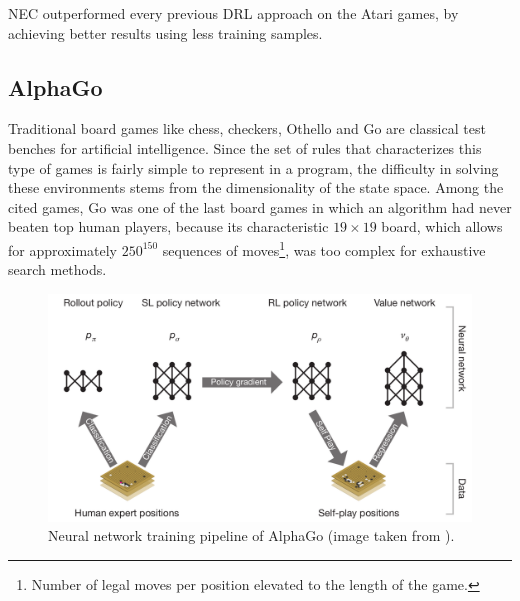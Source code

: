 NEC outperformed every previous DRL approach on the Atari games, by achieving 
better results using less training samples.

\subsection{AlphaGo} \label{s:alphago}
Traditional board games like chess, checkers, Othello and Go are classical 
test benches for artificial intelligence. Since the set of rules that
characterizes this type of games is fairly simple to represent in a program, the
difficulty in solving these environments stems from the dimensionality of the 
state space. Among the cited games, Go was one of the last board games in which 
an algorithm had never beaten top human players, because its characteristic 
$19 \times 19$ board, which allows for approximately $250^{150}$ sequences of
moves\footnote{Number of legal moves per position elevated to the length of the 
game.}, was too complex for exhaustive search methods.
%
\begin{figure}
    \includegraphics[width=\textwidth]{pictures/alphago}
    \centering
    \caption[Neural network training pipeline of AlphaGo]{Neural network 
	    training pipeline of AlphaGo (image taken from \cite{silver2016mastering}).}
    \label{f:alphago}
\end{figure}
%

